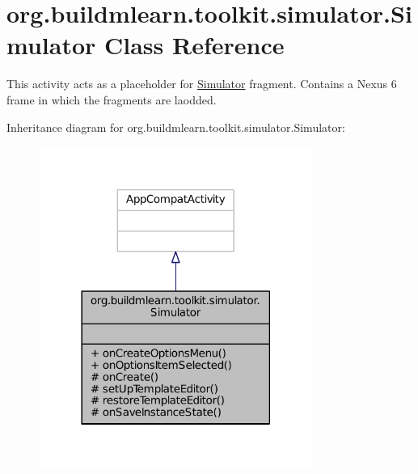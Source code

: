 \hypertarget{classorg_1_1buildmlearn_1_1toolkit_1_1simulator_1_1Simulator}{\section{org.\-buildmlearn.\-toolkit.\-simulator.\-Simulator Class Reference}
\label{classorg_1_1buildmlearn_1_1toolkit_1_1simulator_1_1Simulator}
}


This activity acts as a placeholder for \hyperlink{classorg_1_1buildmlearn_1_1toolkit_1_1simulator_1_1Simulator}{Simulator} fragment. Contains a Nexus 6 frame in which the fragments are laodded.  




Inheritance diagram for org.\-buildmlearn.\-toolkit.\-simulator.\-Simulator\-:
\nopagebreak
\begin{figure}[H]
\begin{center}
\leavevmode
\includegraphics[width=254pt]{da/dc4/classorg_1_1buildmlearn_1_1toolkit_1_1simulator_1_1Simulator__inherit__graph}
\end{center}
\end{figure}


